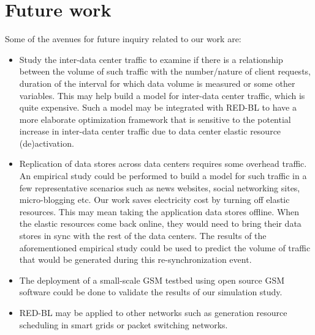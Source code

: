 \section{Future work} Some of the avenues for future inquiry related to our work are:

\begin{itemize}
\item Study the inter-data center traffic to examine if there is a relationship between the volume of such traffic with the number/nature of client requests, duration of the interval for which data volume is measured or some other variables. This may help build a model for inter-data center traffic, which is quite expensive. Such a model may be integrated with RED-BL to have a more elaborate optimization framework that is sensitive to the potential increase in inter-data center traffic due to data center elastic resource (de)activation.
\item Replication of data stores across data centers requires some overhead traffic. An empirical study could be performed to build a model for such traffic in a few representative scenarios such as news websites, social networking sites, micro-blogging etc. Our work saves electricity cost by turning off elastic resources. This may mean taking the application data stores offline. When the elastic resources come back online, they would need to bring their data stores in sync with the rest of the data centers. The results of the aforementioned empirical study could be used to predict the volume of traffic that would be generated during this re-synchronization event.
\item The deployment of a small-scale GSM testbed using open source GSM software could be done to validate the results of our simulation study.
\item RED-BL may be applied to other networks such as generation resource scheduling in smart grids or packet switching networks.
\end{itemize}
